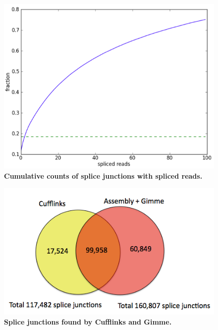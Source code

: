 \documentclass[10pt]{article}
\begin{document}
\begin{figure}[!ht]
\begin{center}
\includegraphics[width=5in]{figure16.png}
\end{center}
\caption{
{\bf Cumulative counts of splice junctions with spliced reads.}
}
\label{figure16}
\end{figure}

\begin{figure}[!ht]
\begin{center}
\includegraphics[width=5in]{figure17.png}
\end{center}
\caption{
{\bf Splice junctions found by Cufflinks and Gimme.}
}
\label{figure17}
\end{figure}
\end{document}
